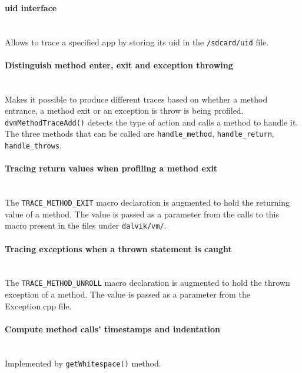 \paragraph{} ~\\


\paragraph{uid interface} ~\\
Allows to trace a specified app by storing its uid in the
\texttt{/sdcard/uid} file.

\paragraph{Distinguish method enter, exit and exception throwing} ~\\
Makes it possible to produce different traces based on whether a
method entrance, a method exit or an exception is throw is being
profiled. \texttt{dvmMethodTraceAdd()} detects the type of action and calls a
method to handle it. The three methods that can be called are
\texttt{handle\_method}, \texttt{handle\_return}, \texttt{handle\_throws}.

\paragraph{Tracing return values when profiling a method exit} ~\\
The \texttt{TRACE\_METHOD\_EXIT} macro declaration is augmented to hold the
returning value of a method. The value is passed as a parameter from
the calls to this macro present in the files under \texttt{dalvik/vm/}.

\paragraph{Tracing exceptions when a thrown statement is caught} ~\\
The \texttt{TRACE\_METHOD\_UNROLL} macro declaration is augmented to hold the
thrown exception of a method. The value is passed as a parameter from
the Exception.cpp file.

\paragraph{Compute method calls' timestamps and indentation} ~\\
Implemented by \texttt{getWhitespace()} method.

